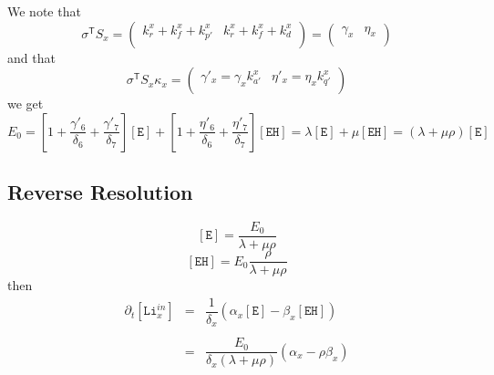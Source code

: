 \documentclass[aps,onecolumn,11pt]{revtex4}
\newcommand{\mychem}[1]{\mathtt{#1}}
\newcommand{\myconc}[1]{\left\lbrack{#1}\right\rbrack}
\newcommand{\LiIn}[1]{\myconc{\mychem{Li}_{#1}^{in}}}
\newcommand{\EHin}{\myconc{\mychem{EH}}}
\newcommand{\Eout}{\myconc{\mychem{E}}}
\newcommand{\mytrn}[1]{{#1}^{\mathsf{T}}}
\begin{document}
We note that
\begin{equation}
	\mytrn{\sigma}{S_x} =
	\begin{pmatrix}
	k_r^x + k_f^x + k_{p'}^x & k_r^x + k_f^x + k_d^x\\
	\end{pmatrix}
	=
	\begin{pmatrix}
		\gamma_x & \eta_x\\
	\end{pmatrix}
\end{equation}
and that
\begin{equation}
	\mytrn{\sigma}{S_x}\kappa_x = \begin{pmatrix}
		\gamma'_x = \gamma_x k_{a'}^x & \eta'_x = \eta_x k_{q'}^x\\
	\end{pmatrix}
\end{equation}
we get
\begin{equation}
	E_0 = \left\lbrack
	1 + \dfrac{\gamma'_6}{\delta_6} + \dfrac{\gamma'_7}{\delta_7}
	\right\rbrack \Eout
	+
	\left\lbrack
	1 + \dfrac{\eta'_6}{\delta_6} + \dfrac{\eta'_7}{\delta_7}
	\right\rbrack \EHin
	= \lambda\Eout + \mu\EHin = \left(\lambda + \mu \rho\right) \Eout
\end{equation}

\subsection{Reverse Resolution}
\begin{equation}
	\Eout = \dfrac{E_0}{\lambda + \mu \rho}
\end{equation}
\begin{equation}
	\EHin = E_0 \dfrac{\rho}{\lambda + \mu \rho}
\end{equation}
then
\begin{equation}
\begin{array}{rcl}
	\partial_t\LiIn{x} & = & \dfrac{1}{\delta_x}\left(\alpha_x \Eout - \beta_x \EHin \right)\\
	\\
	 & = & \dfrac{E_0}{\delta_x\left(\lambda + \mu \rho\right)}
	 \left(\alpha_x - \rho \beta_x\right)
	 \\
\end{array}
\end{equation}
\end{document}
